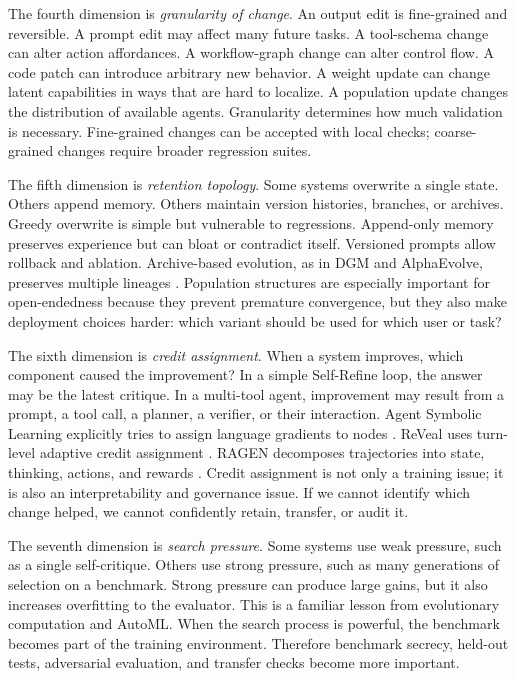 The fourth dimension is \emph{granularity of change}. An output edit is fine-grained and reversible. A prompt edit may affect many future tasks. A tool-schema change can alter action affordances. A workflow-graph change can alter control flow. A code patch can introduce arbitrary new behavior. A weight update can change latent capabilities in ways that are hard to localize. A population update changes the distribution of available agents. Granularity determines how much validation is necessary. Fine-grained changes can be accepted with local checks; coarse-grained changes require broader regression suites.

The fifth dimension is \emph{retention topology}. Some systems overwrite a single state. Others append memory. Others maintain version histories, branches, or archives. Greedy overwrite is simple but vulnerable to regressions. Append-only memory preserves experience but can bloat or contradict itself. Versioned prompts allow rollback and ablation. Archive-based evolution, as in DGM and AlphaEvolve, preserves multiple lineages \cite{darwingodelmachine2025,alphaevolve2025}. Population structures are especially important for open-endedness because they prevent premature convergence, but they also make deployment choices harder: which variant should be used for which user or task?

The sixth dimension is \emph{credit assignment}. When a system improves, which component caused the improvement? In a simple Self-Refine loop, the answer may be the latest critique. In a multi-tool agent, improvement may result from a prompt, a tool call, a planner, a verifier, or their interaction. Agent Symbolic Learning explicitly tries to assign language gradients to nodes \cite{agentsymboliclearning2024}. ReVeal uses turn-level adaptive credit assignment \cite{reveal2025}. RAGEN decomposes trajectories into state, thinking, actions, and rewards \cite{wang2025ragen}. Credit assignment is not only a training issue; it is also an interpretability and governance issue. If we cannot identify which change helped, we cannot confidently retain, transfer, or audit it.

The seventh dimension is \emph{search pressure}. Some systems use weak pressure, such as a single self-critique. Others use strong pressure, such as many generations of selection on a benchmark. Strong pressure can produce large gains, but it also increases overfitting to the evaluator. This is a familiar lesson from evolutionary computation and AutoML. When the search process is powerful, the benchmark becomes part of the training environment. Therefore benchmark secrecy, held-out tests, adversarial evaluation, and transfer checks become more important.

